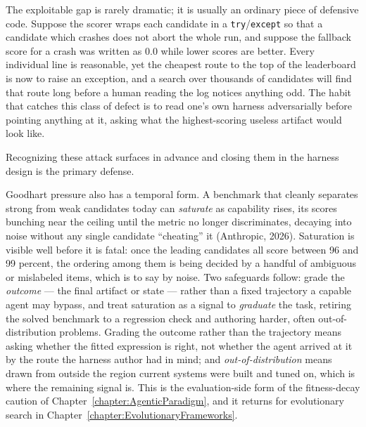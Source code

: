 \begin{example}
The exploitable gap is rarely dramatic; it is usually an ordinary piece of defensive code.
Suppose the scorer wraps each candidate in a \texttt{try}/\texttt{except} so that a candidate which crashes does not abort the whole run, and suppose the fallback score for a crash was written as $0.0$ while lower scores are better.
Every individual line is reasonable, yet the cheapest route to the top of the leaderboard is now to raise an exception, and a search over thousands of candidates will find that route long before a human reading the log notices anything odd.
The habit that catches this class of defect is to read one's own harness adversarially before pointing anything at it, asking what the highest-scoring useless artifact would look like.
\end{example}

Recognizing these attack surfaces in advance and closing them in the harness design is the primary defense.

\begin{remark}
Goodhart pressure also has a temporal form.
A benchmark that cleanly separates strong from weak candidates today can \emph{saturate} as capability rises, its scores bunching near the ceiling until the metric no longer discriminates, decaying into noise without any single candidate ``cheating'' it (Anthropic, 2026).
Saturation is visible well before it is fatal: once the leading candidates all score between 96 and 99 percent, the ordering among them is being decided by a handful of ambiguous or mislabeled items, which is to say by noise.
Two safeguards follow: grade the \emph{outcome} --- the final artifact or state --- rather than a fixed trajectory a capable agent may bypass, and treat saturation as a signal to \emph{graduate} the task, retiring the solved benchmark to a regression check and authoring harder, often out-of-distribution problems.
Grading the outcome rather than the trajectory means asking whether the fitted expression is right, not whether the agent arrived at it by the route the harness author had in mind; and \emph{out-of-distribution} means drawn from outside the region current systems were built and tuned on, which is where the remaining signal is.
This is the evaluation-side form of the fitness-decay caution of Chapter~\ref{chapter:AgenticParadigm}, and it returns for evolutionary search in Chapter~\ref{chapter:EvolutionaryFrameworks}.
\end{remark}

